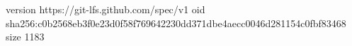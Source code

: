 version https://git-lfs.github.com/spec/v1
oid sha256:c0b2568eb3f0e23d0f58f769642230dd371dbe4aecc0046d281154c0fbf83468
size 1183
